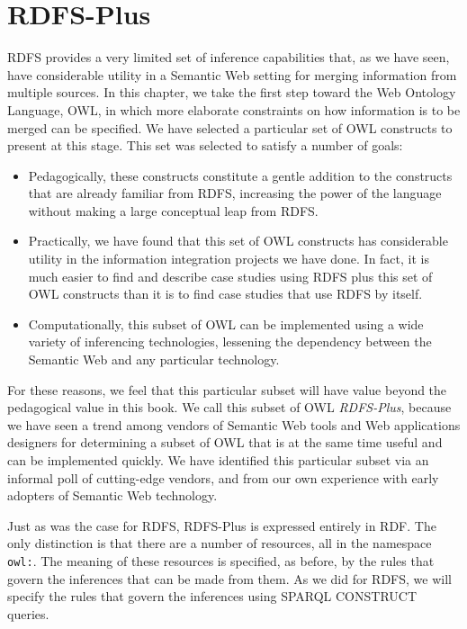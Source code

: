 \chapter{RDFS-Plus}
\label{ch9}

RDFS provides a very limited set of inference capabilities that, as we
have seen, have considerable utility in a Semantic Web setting for
merging information from multiple sources. In this chapter, we take the
first step toward the Web Ontology Language, OWL, in which more
elaborate constraints on how information is to be merged can be
specified. We have selected a particular set of OWL constructs to
present at this stage. This set was selected to satisfy a number of
goals:

\begin{itemize}
\item Pedagogically, these constructs constitute a gentle addition to the
constructs that are already familiar from RDFS, increasing the power of
the language without making a large conceptual leap from RDFS.

\item Practically, we have found that this set of OWL constructs has
considerable utility in the
information integration projects we have done. In fact, it is much
easier to find and describe case studies using RDFS plus this set of OWL
constructs than it is to find case studies that use RDFS by itself.

\item Computationally, this subset of OWL can be implemented using a wide
variety of inferencing technologies, lessening the dependency between
the Semantic Web and any particular technology.
\end{itemize}

For these reasons, we feel that this particular subset will have value
beyond the pedagogical value in this book. We call this subset of OWL
\emph{RDFS-Plus}, because we have seen a trend among vendors of Semantic Web tools
and Web applications designers for determining a subset of OWL that is
at the same time useful and can be implemented quickly. We have
identified this particular subset via an informal poll of cutting-edge
vendors, and from our own experience with early adopters of Semantic Web
technology.

Just as was the case for RDFS, RDFS-Plus is expressed entirely in RDF.
The only distinction is
that there are a number of resources, all in the namespace \texttt{owl:}. The
meaning of these resources is specified, as before, by the rules that
govern the inferences that can be made from them. As we did for RDFS, we
will specify the rules that govern the inferences using SPARQL CONSTRUCT
queries.

